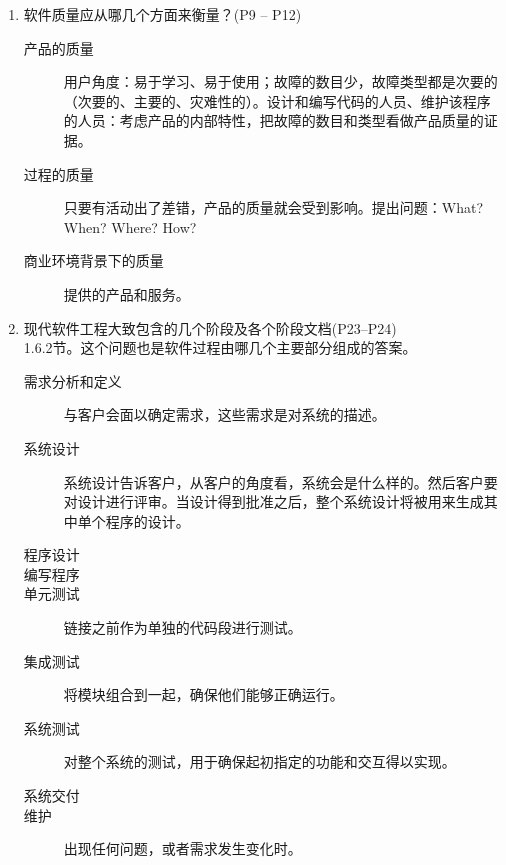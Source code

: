 \documentclass[14pt, letterpaper, UTF8, fontset=windowsnew, heading=true]{article}
\newcommand{\ul}[1]{\underline{#1}}
\begin{document}
\begin{enumerate}
	\item 软件质量应从哪几个方面来衡量？(P9 -- P12)
	\begin{description}
		\item[产品的质量] 用户角度：易于学习、易于使用；故障的数目少，故障类型都是次要的（次要的、主要的、灾难性的）。设计和编写代码的人员、维护该程序的人员：考虑产品的内部特性，把故障的数目和类型看做产品质量的证据。
		\item[过程的质量] 只要有活动出了差错，产品的质量就会受到影响。提出问题：What? When? Where? How?
		\item[商业环境背景下的质量] 提供的产品和服务。
	\end{description}


	\item 现代软件工程大致包含的几个阶段及各个阶段文档(P23--P24) \\
	1.6.2节。这个问题也是软件过程由哪几个主要部分组成的答案。
	\begin{description}
		\item[需求分析和定义] 与客户会面以确定需求，这些需求是对系统的描述。
		\item[系统设计] 系统设计告诉客户，从客户的角度看，系统会是什么样的。然后客户要对设计进行评审。当设计得到批准之后，整个系统设计将被用来生成其中单个程序的设计。
		\item[程序设计] 
		\item[编写程序]
		\item[单元测试] 链接之前作为单独的代码段进行测试。
		\item[集成测试] 将模块组合到一起，确保他们能够正确运行。
		\item[系统测试] 对整个系统的测试，用于确保起初指定的功能和交互得以实现。
		\item[系统交付] 
		\item[维护] 出现任何问题，或者需求发生变化时。
	\end{description}


\end{enumerate}
\end{document}
